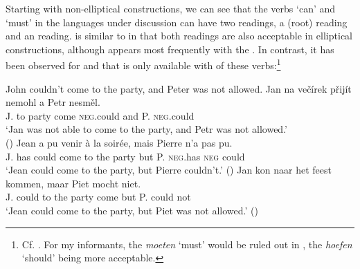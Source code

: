 \documentclass[output=paper,colorlinks,citecolor=brown,]{langsci/langscibook}
\begin{document}
Starting with non-elliptical constructions, we can see that the verbs `can' and `must' in the languages under discussion can have two readings, a  (root) reading and an  reading.  is similar to  in that both readings are also acceptable in elliptical constructions, although  appears most frequently with the . In contrast, it has been observed for  and  that  is only available with  of these  verbs:\footnote{Cf. \cite{Barbiers1995,Lobeck1995,Aelbrecht2008}. For my informants, the  \textit{moeten} ‘must’ would be ruled out in , the  \textit{hoefen} ‘should’ being more acceptable.}

\begin{exe}
\label{18}
\begin{xlist}
\ex\label{18a} John couldn't come to the party, and Peter was not allowed.
\ex \label{18b}
\gll  Jan na večírek přijít  nemohl    a    Petr  nesměl.\\
J.    to  party    come \textsc{neg}.could  and P.     \textsc{neg}.could\\
\glt `Jan was not able to come to the party, and Petr was not allowed.' \\ { } \hfill ()
\ex \label{18c}
\gll  Jean a   pu venir  à  la soirée,  mais Pierre n'a  pas  pu. \\
J.  has could come to the party  but   P. {\textsc{neg}.has} \textsc{neg} could\\
\glt `Jean could come to the party, but Pierre couldn't.' \hfill  ()
\ex\label{18d}
\gll  Jan kon    naar het feest kommen, maar Piet mocht niet. \\
 J.   could to     the party come      but     P.    could   not\\
 \glt `Jean could come to the party, but Piet was not allowed.' \hfill ()
\end{xlist}


\label{19}
\begin{xlist}
\end{xlist}
\end{exe}
\end{document}
